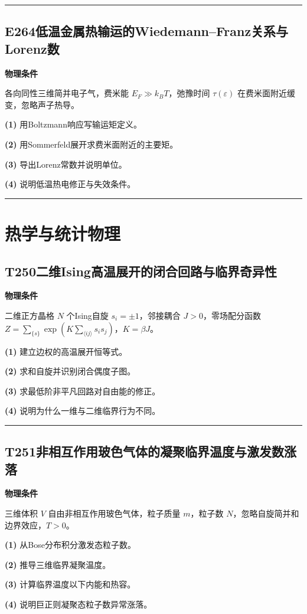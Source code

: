 \documentclass[UTF8,a4paper,11pt,oneside,openany]{ctexbook}
\begin{document}
\par\bigskip\hrule\bigskip
\section*{E264\quad 低温金属热输运的Wiedemann–Franz关系与Lorenz数}
\textbf{物理条件}\par 各向同性三维简并电子气，费米能 \(E_F\gg k_BT\)，弛豫时间 \(\tau(\varepsilon)\) 在费米面附近缓变，忽略声子热导。
\par\noindent\textbf{(1)} 用Boltzmann响应写输运矩定义。
\par\noindent\textbf{(2)} 用Sommerfeld展开求费米面附近的主要矩。
\par\noindent\textbf{(3)} 导出Lorenz常数并说明单位。
\par\noindent\textbf{(4)} 说明低温热电修正与失效条件。

\par\bigskip\hrule\bigskip
\chapter{热学与统计物理}
\section*{T250\quad 二维Ising高温展开的闭合回路与临界奇异性}
\textbf{物理条件}\par 二维正方晶格 \(N\) 个Ising自旋 \(s_i=\pm1\)，邻接耦合 \(J>0\)，零场配分函数 \(Z=\sum_{\{s\}}\exp(K\sum_{\langle ij\rangle}s_is_j)\)，\(K=\beta J\)。
\par\noindent\textbf{(1)} 建立边权的高温展开恒等式。
\par\noindent\textbf{(2)} 求和自旋并识别闭合偶度子图。
\par\noindent\textbf{(3)} 求最低阶非平凡回路对自由能的修正。
\par\noindent\textbf{(4)} 说明为什么一维与二维临界行为不同。

\par\bigskip\hrule\bigskip
\section*{T251\quad 非相互作用玻色气体的凝聚临界温度与激发数涨落}
\textbf{物理条件}\par 三维体积 \(V\) 自由非相互作用玻色气体，粒子质量 \(m\)，粒子数 \(N\)，忽略自旋简并和边界效应，\(T>0\)。
\par\noindent\textbf{(1)} 从Bose分布积分激发态粒子数。
\par\noindent\textbf{(2)} 推导三维临界凝聚温度。
\par\noindent\textbf{(3)} 计算临界温度以下内能和热容。
\par\noindent\textbf{(4)} 说明巨正则凝聚态粒子数异常涨落。
\end{document}
